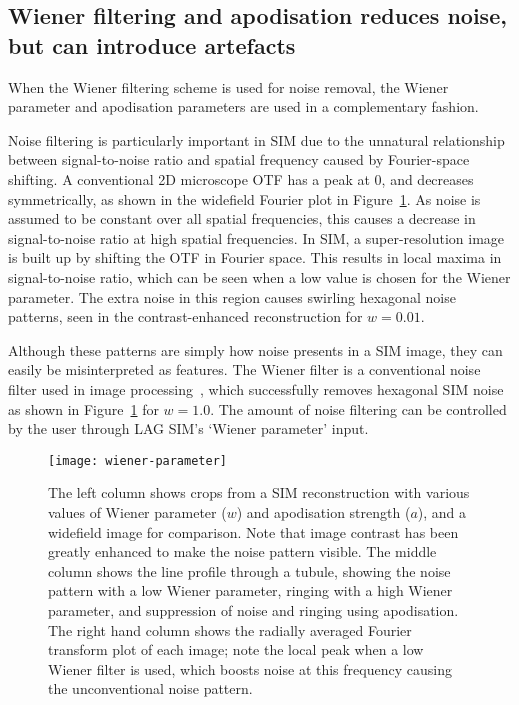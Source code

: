 \subsection{Wiener filtering and apodisation reduces noise, but can introduce artefacts}\label{sec:wiener-recon}
When the Wiener filtering scheme is used for noise removal, the Wiener parameter and apodisation parameters are used in a complementary fashion.

Noise filtering is particularly important in SIM due to the unnatural relationship between signal-to-noise ratio and spatial frequency caused by Fourier-space shifting.
A conventional 2D microscope OTF has a peak at 0, and decreases symmetrically, as shown in the widefield Fourier plot in Figure~\ref{fig:wiener-parameter}.
As noise is assumed to be constant over all spatial frequencies, this causes a decrease in signal-to-noise ratio at high spatial frequencies.
In SIM, a super-resolution image is built up by shifting the OTF in Fourier space.
This results in local maxima in signal-to-noise ratio, which can be seen when a low value is chosen for the Wiener parameter.
The extra noise in this region causes swirling hexagonal noise patterns, seen in the contrast-enhanced reconstruction for $w=0.01$.

Although these patterns are simply how noise presents in a SIM image, they can easily be misinterpreted as features.
The Wiener filter is a conventional noise filter used in image processing~\cite[\textit{ch. 4}]{brown2012introduction}, which successfully removes hexagonal SIM noise as shown in Figure~\ref{fig:wiener-parameter} for $w=1.0$.
The amount of noise filtering can be controlled by the user through LAG SIM's `Wiener parameter' input.


\begin{figure}[p]
\centering
\texttt{[image: wiener-parameter]}
\caption[LAG SIM: The Wiener parameter and apodisation strength must be chosen to minimise artefacts]{The left column shows crops from a SIM reconstruction with various values of Wiener parameter ($w$) and apodisation strength ($a$), and a widefield image for comparison. Note that image contrast has been greatly enhanced to make the noise pattern visible. The middle column shows the line profile through a tubule, showing the noise pattern with a low Wiener parameter, ringing with a high Wiener parameter, and suppression of noise and ringing using apodisation. The right hand column shows the radially averaged Fourier transform plot of each image; note the local peak when a low Wiener filter is used, which boosts noise at this frequency causing the unconventional noise pattern.}
\label{fig:wiener-parameter}
\end{figure}

